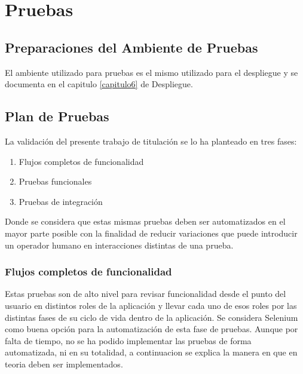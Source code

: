 
\chapter{Pruebas}
\label{capitulo5}

\section{Preparaciones del Ambiente de Pruebas}
El ambiente utilizado para pruebas es el mismo utilizado para el despliegue y se documenta en el capitulo \ref{capitulo6} de Despliegue.

\section{Plan de Pruebas}
La validación del presente trabajo de titulación se lo ha planteado en tres fases:
\begin{enumerate}
  \item Flujos completos de funcionalidad
  \item Pruebas funcionales
  \item Pruebas de integración
\end{enumerate}
Donde se considera que estas mismas pruebas deben ser automatizados en el mayor parte posible con la finalidad de reducir variaciones que puede introducir un operador humano en interacciones distintas de una prueba.

\subsection{Flujos completos de funcionalidad}
Estas pruebas son de alto nivel para revisar funcionalidad desde el punto del usuario en distintos roles de la aplicación y llevar cada uno de esos roles por las distintas fases de su ciclo de vida dentro de la aplicación. Se considera Selenium como buena opción para la automatización de esta fase de pruebas. Aunque por falta de tiempo, no se ha podido implementar las pruebas de forma automatizada, ni en su totalidad, a continuacion se explica la manera en que en teoria deben ser implementados.

